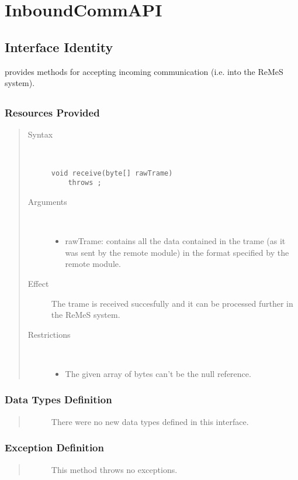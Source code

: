 \section{InboundCommAPI}
\label{api:rm-inbound-comm-api}

\subsection{Interface Identity}

\npar {} provides methods for accepting incoming
communication (i.e. into the ReMeS system).

\subsection{}

\subsubsection{Resources Provided}

\begin{quote}
	\begin{description}
		\item[Syntax] \ %
		\begin{verbatim}
void receive(byte[] rawTrame)
	throws ;
		\end{verbatim}
		\item[Arguments] \
		\begin{itemize}
		  \item rawTrame: contains all the data contained in the trame (as it was
		  sent by the remote module) in the format specified by the remote module.
		\end{itemize}
		\item[Effect] The trame is received succesfully and it can be processed
		further in the ReMeS system.
		\item[Restrictions] \
		\begin{itemize}
		  \item The given array of bytes can't be the null reference.
		\end{itemize}
	\end{description} 
\end{quote}

\subsubsection{Data Types Definition}

\begin{quote}
	\begin{description}
		\item[] There were no new data types defined in this interface.
	\end{description} 
\end{quote}

\subsubsection{Exception Definition} 

\begin{quote}
	\begin{description}
		\item[] This method throws no exceptions.
	\end{description} 
\end{quote}
